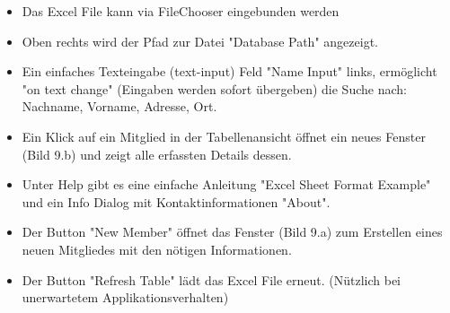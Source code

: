\documentclass{article}
\begin{document}
\begin{itemize}

		\item Das Excel File kann via FileChooser eingebunden werden
		\item Oben rechts wird der Pfad zur Datei "Database Path" angezeigt.
		\item Ein einfaches Texteingabe (text-input) Feld "Name Input" links, ermöglicht "on text change" (Eingaben werden sofort übergeben) die Suche nach: Nachname, Vorname, Adresse, Ort.
		\item Ein Klick auf ein Mitglied in der Tabellenansicht öffnet ein neues Fenster (Bild 9.b) und zeigt alle erfassten Details dessen.
		\item Unter Help gibt es eine einfache Anleitung "Excel Sheet Format Example" und ein Info Dialog mit Kontaktinformationen "About".
		\item Der Button "New Member" öffnet das Fenster (Bild 9.a) zum Erstellen eines neuen Mitgliedes mit den nötigen Informationen.
		\item Der Button "Refresh Table" lädt das Excel File erneut. (Nützlich bei unerwartetem Applikationsverhalten)
	 \end{itemize}

\newpage

\end{document}
